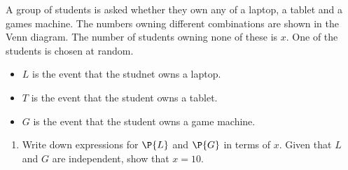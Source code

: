 \begin{problem}
    \begin{center}
    \end{center}

    A group of students is asked whether they own any of a laptop, a tablet and a games machine. The numbers owning different combinations are shown in the Venn diagram. The number of students owning none of these is $x$. One of the students is chosen at random.
    
    \begin{itemize}
        \item $L$ is the event that the studnet owns a laptop.
        \item $T$ is the event that the student owns a tablet.
        \item $G$ is the event that the student owns a game machine.
    \end{itemize}

    \begin{enumerate}
        \item Write down expressions for $\P{L}$ and $\P{G}$ in terms of $x$. Given that $L$ and $G$ are independent, show that $x = 10$.
    \end{enumerate}


\end{problem}
